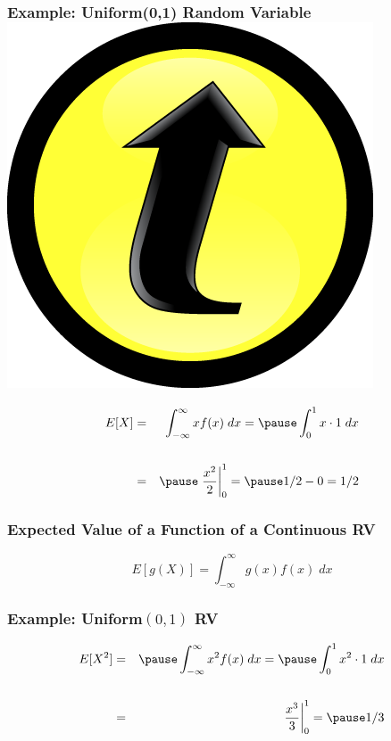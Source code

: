 \documentclass[handout]{beamer}
\begin{document}
\begin{frame}
\frametitle{Example: Uniform(0,1) Random Variable \hfill \includegraphics[scale = 0.05]{./images/clicker}}
\begin{eqnarray*}
	E[X] &=&  \int_{-\infty}^\infty x f(x) \; dx =\pause  \int_{0}^1 x \cdot 1 \; dx \\ \\
		&=& \pause \left.\frac{x^2}{2}\right|_0^1 =\pause  1/2  - 0 = 1/2
\end{eqnarray*}
\end{frame}
\begin{frame}
\frametitle{Expected Value of a Function of a Continuous RV}
	$$\boxed{E[g(X)] = \int_{-\infty}^\infty g(x) f(x) \; dx}$$
\end{frame}



\begin{frame}
\frametitle{Example: Uniform$(0,1)$ RV}
	\begin{eqnarray*}
	E[X^2] &=& \pause \int_{-\infty}^\infty x^2 f(x) \; dx = \pause \int_0^1 x^2 \cdot 1 \; dx\\ \\
		&=& \left. \frac{x^3}{3}\right|_0^1 = \pause 1/3
	\end{eqnarray*}
\end{frame}


\end{document}
